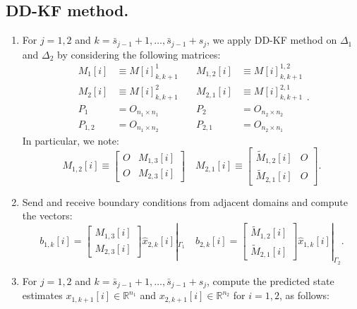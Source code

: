 \subsection{DD-KF method.}
\begin{enumerate}
\item For $j=1,2$ and $k=\bar{s}_{j-1}+1,\ldots,\bar{s}_{j-1}+s_{j}$, we apply  DD-KF method on $\Delta_{1}$ and $\Delta_{2}$ by considering the following matrices:
\begin{equation}
\begin{array}{llllll}
M_{1}[i]&\equiv M[i]_{k,k+1}^{1} &\quad M_{1,2}[i]&\equiv M[i]_{k,k+1}^{1,2}\\
M_{2}[i]&\equiv M[i]_{k,k+1}^{2}& \quad M_{2,1}[i]&\equiv M[i]_{k,k+1}^{2,1}\\
P_{1}&=O_{n_{1}\times n_{1}}& \quad  P_{2}&=O_{n_{2}\times n_{2}}\\ P_{1,2}&=O_{n_{1}\times n_{2}} & \quad P_{2,1}&=O_{n_{2}\times n_{1}}
\end{array}.
\end{equation}
In particular, we note:
\begin{equation}
    M_{1,2}[i]\equiv \left[\begin{array}{lll} O & M_{1,3}[i]\\ 
    O& M_{2,3}[i]
    \end{array}\right]\quad  M_{2,1}[i]\equiv \left[\begin{array}{lll} \tilde{M}_{1,2}[i] & O\\ 
     \tilde{M}_{2,1}[i] & O
    \end{array}\right].
\end{equation}
\item Send and receive  boundary conditions from  adjacent domains and compute the vectors:
\begin{equation}
b_{1,k}[i]=\left[\begin{array}{lll} M_{1,3}[i]\\ 
    M_{2,3}[i]
    \end{array}\right]\widehat{x}_{2,k}[i]|_{\Gamma_{1}} \quad
    b_{2,k}[i]=\left[\begin{array}{lll} \tilde{M}_{1,2}[i]\\ 
    \tilde{M}_{2,1}[i]
    \end{array}\right]\widehat{x}_{1,k}[i]|_{\Gamma_{2}}.
\end{equation}
\item For $j=1,2$ and $k=\bar{s}_{j-1}+1,\ldots,\bar{s}_{j-1}+s_{j}$, compute the predicted state estimates $x_{1,k+1}[i]\in \mathbb{R}^{n_{1}}$ and $x_{2,k+1}[i]\in \mathbb{R}^{n_{2}}$ for $ i=1,2$, as follows:

\end{enumerate}
